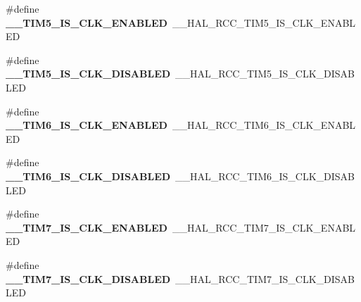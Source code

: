 \begin{DoxyCompactItemize}
\item 
\#define {\bfseries \+\_\+\+\_\+\+T\+I\+M5\+\_\+\+I\+S\+\_\+\+C\+L\+K\+\_\+\+E\+N\+A\+B\+L\+ED}~\+\_\+\+\_\+\+H\+A\+L\+\_\+\+R\+C\+C\+\_\+\+T\+I\+M5\+\_\+\+I\+S\+\_\+\+C\+L\+K\+\_\+\+E\+N\+A\+B\+L\+ED\hypertarget{group___h_a_l___r_c_c___aliased_gaa8c5734b25ae1c3f802d6c0b8472209d}{}\label{group___h_a_l___r_c_c___aliased_gaa8c5734b25ae1c3f802d6c0b8472209d}

\item 
\#define {\bfseries \+\_\+\+\_\+\+T\+I\+M5\+\_\+\+I\+S\+\_\+\+C\+L\+K\+\_\+\+D\+I\+S\+A\+B\+L\+ED}~\+\_\+\+\_\+\+H\+A\+L\+\_\+\+R\+C\+C\+\_\+\+T\+I\+M5\+\_\+\+I\+S\+\_\+\+C\+L\+K\+\_\+\+D\+I\+S\+A\+B\+L\+ED\hypertarget{group___h_a_l___r_c_c___aliased_ga4cd9d73f820261630786460fd3aa0453}{}\label{group___h_a_l___r_c_c___aliased_ga4cd9d73f820261630786460fd3aa0453}

\item 
\#define {\bfseries \+\_\+\+\_\+\+T\+I\+M6\+\_\+\+I\+S\+\_\+\+C\+L\+K\+\_\+\+E\+N\+A\+B\+L\+ED}~\+\_\+\+\_\+\+H\+A\+L\+\_\+\+R\+C\+C\+\_\+\+T\+I\+M6\+\_\+\+I\+S\+\_\+\+C\+L\+K\+\_\+\+E\+N\+A\+B\+L\+ED\hypertarget{group___h_a_l___r_c_c___aliased_gab97e01d763b85c9b63bf8b76591e541b}{}\label{group___h_a_l___r_c_c___aliased_gab97e01d763b85c9b63bf8b76591e541b}

\item 
\#define {\bfseries \+\_\+\+\_\+\+T\+I\+M6\+\_\+\+I\+S\+\_\+\+C\+L\+K\+\_\+\+D\+I\+S\+A\+B\+L\+ED}~\+\_\+\+\_\+\+H\+A\+L\+\_\+\+R\+C\+C\+\_\+\+T\+I\+M6\+\_\+\+I\+S\+\_\+\+C\+L\+K\+\_\+\+D\+I\+S\+A\+B\+L\+ED\hypertarget{group___h_a_l___r_c_c___aliased_ga7388045de140441a9623a6a3b10fd60f}{}\label{group___h_a_l___r_c_c___aliased_ga7388045de140441a9623a6a3b10fd60f}

\item 
\#define {\bfseries \+\_\+\+\_\+\+T\+I\+M7\+\_\+\+I\+S\+\_\+\+C\+L\+K\+\_\+\+E\+N\+A\+B\+L\+ED}~\+\_\+\+\_\+\+H\+A\+L\+\_\+\+R\+C\+C\+\_\+\+T\+I\+M7\+\_\+\+I\+S\+\_\+\+C\+L\+K\+\_\+\+E\+N\+A\+B\+L\+ED\hypertarget{group___h_a_l___r_c_c___aliased_gaa484c04105e0d337939113a91662be6d}{}\label{group___h_a_l___r_c_c___aliased_gaa484c04105e0d337939113a91662be6d}

\item 
\#define {\bfseries \+\_\+\+\_\+\+T\+I\+M7\+\_\+\+I\+S\+\_\+\+C\+L\+K\+\_\+\+D\+I\+S\+A\+B\+L\+ED}~\+\_\+\+\_\+\+H\+A\+L\+\_\+\+R\+C\+C\+\_\+\+T\+I\+M7\+\_\+\+I\+S\+\_\+\+C\+L\+K\+\_\+\+D\+I\+S\+A\+B\+L\+ED\hypertarget{group___h_a_l___r_c_c___aliased_ga5060996ff360bbc9ff44e7089d970e14}{}\label{group___h_a_l___r_c_c___aliased_ga5060996ff360bbc9ff44e7089d970e14}


\end{DoxyCompactItemize}
